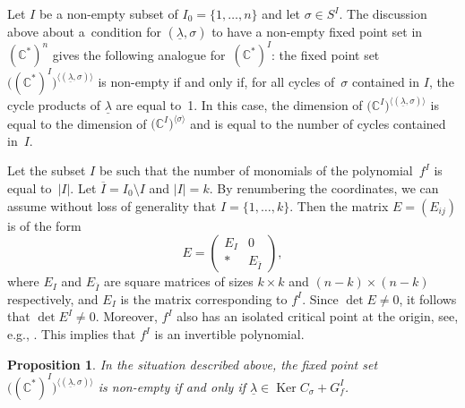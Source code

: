 \documentclass[11pt]{article}
\numberwithin{equation}{section}
\numberwithin{equation}{section}
\newtheorem{Proposition}[Theorem]{Proposition}
 { \theoremstyle{definition}
\newtheorem{Definition}[Theorem]{Definition}
\newtheorem{Remark}[Theorem]{Remark} }
\begin{document}
Let $I$ be a non-empty subset of $I_0=\{1, \dots , n\}$ and let $\sigma \in S^I$. The discussion above about
a~condition for $(\underline{\lambda}, \sigma)$ to have a non-empty fixed point set in $({\mathbb C}^*)^n$ gives the following analogue for~$({\mathbb C}^*)^I$: the fixed point set $\big(({\mathbb C}^*)^I\big)^{\langle (\underline{\lambda}, \sigma) \rangle}$ is non-empty if and only if, for all cycles of~$\sigma$ contained in $I$, the cycle products of $\underline{\lambda}$
are equal to~1. In this case, the dimension of $\big({\mathbb C}^I\big)^{\langle (\underline{\lambda},\sigma) \rangle}$ is equal to the dimension of $\big({\mathbb C}^I\big)^{\langle \sigma \rangle}$ and is equal to the number of cycles contained in~$I$.

Let the subset $I$ be such that the number of monomials of the polynomial~$f^I$ is equal to~$|I|$.
Let $\overline{I}=I_0 \setminus I$ and $|I|=k$. By renumbering the coordinates, we can assume without loss of generality that $I=\{1, \dots , k\}$. Then the matrix $E=(E_{ij})$ is of the form
\[
E = \left( \begin{matrix} E_I & 0 \\ \ast & E_{\overline{I}} \end{matrix} \right),
\]
where $E_I$ and $E_{\overline{I}}$ are square matrices of sizes $k \times k$ and $(n-k) \times (n-k)$ respectively, and $E_I$ is the matrix corresponding to $f^I$. Since $\det E \neq 0$, it follows that $\det E^I \neq 0$. Moreover, $f^I$ also has an isolated critical point at the origin, see, e.g., \cite[Proposition~5]{ET}. This implies that $f^I$ is an invertible polynomial.

\begin{Proposition} \label{prop:fixed_point} In the situation described above, the fixed point set $\big(({\mathbb C}^*)^I\big)^{\langle (\underline{\lambda}, \sigma) \rangle}$
is non-empty if and only if $\underline{\lambda} \in \operatorname{Ker} C_\sigma + G_f^I$.
\end{Proposition}
\end{document}
